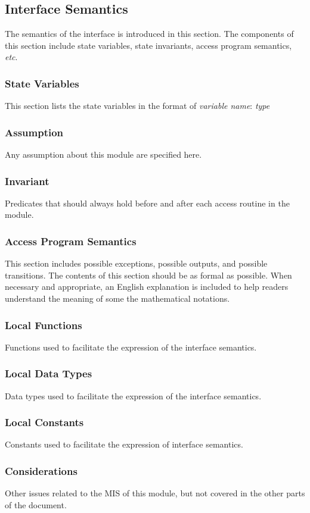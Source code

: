 \documentclass[12pt,titlepage]{article}
\begin{document}
\subsection{Interface Semantics}
The semantics of the interface is introduced in this section. The components of this section include state variables, state invariants, access program semantics, \emph{etc}. 
\subsubsection{State Variables}
This section lists the state variables in the format of \emph{variable name}: \emph{type}
\subsubsection{Assumption}
Any assumption about this module are specified here.
\subsubsection{Invariant} 
Predicates that should always hold before and after each access routine in the module.
\subsubsection{Access Program Semantics} This section includes possible exceptions, possible outputs, and possible transitions. The contents of this section should be as formal as possible. When necessary and appropriate, an English explanation is included to help readers understand the meaning of some the mathematical notations.
\subsubsection{Local Functions} Functions used to facilitate the expression of the interface semantics.
\subsubsection{Local Data Types} Data types used to facilitate the expression of the interface semantics.
\subsubsection{Local Constants} Constants used to facilitate the expression of interface semantics.
\subsubsection{Considerations} Other issues related to the MIS of this module, but not covered in the other parts of the document.
\end{document}
